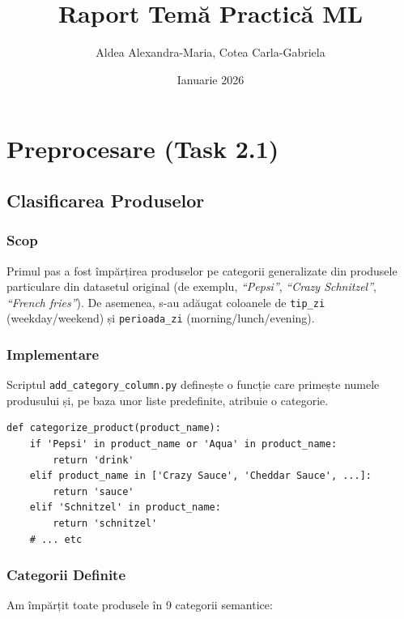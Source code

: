 \documentclass[12pt,a4paper]{article}
\title{\textbf{Raport Temă Practică ML}}
\author{Aldea Alexandra-Maria, Cotea Carla-Gabriela}
\date{Ianuarie 2026}
\begin{document}
\maketitle

\section{Preprocesare (Task 2.1)}

\subsection{Clasificarea Produselor}

\subsubsection*{Scop}

Primul pas a fost împărțirea produselor pe categorii generalizate din produsele particulare din datasetul original (de exemplu, \textit{``Pepsi''}, \textit{``Crazy Schnitzel''}, \textit{``French fries''}). De asemenea, s-au adăugat coloanele de \texttt{tip\_zi} (weekday/weekend) și \texttt{perioada\_zi} (morning/lunch/evening).

\subsubsection*{Implementare}

Scriptul \texttt{add\_category\_column.py} definește o funcție care primește numele produsului și, pe baza unor liste predefinite, atribuie o categorie.

\begin{lstlisting}
def categorize_product(product_name):
    if 'Pepsi' in product_name or 'Aqua' in product_name:
        return 'drink'
    elif product_name in ['Crazy Sauce', 'Cheddar Sauce', ...]:
        return 'sauce'
    elif 'Schnitzel' in product_name:
        return 'schnitzel'
    # ... etc
\end{lstlisting}

\subsubsection*{Categorii Definite}

Am împărțit toate produsele în 9 categorii semantice:
\end{document}
